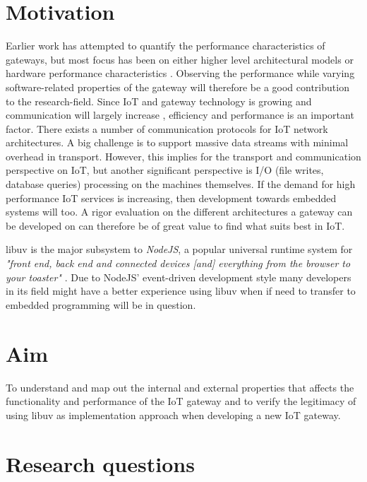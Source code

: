 \section{Motivation}
\label{sec:motivation}

Earlier work has attempted to quantify the performance characteristics of
gateways, but most focus has been on either higher level architectural models
\cite{chen2011brief} \cite{zachariah2015internet} or hardware performance
characteristics \cite{kruger2014benchmarking}. Observing the performance while
varying software-related properties of the gateway will therefore be a good
contribution to the research-field. Since IoT and gateway technology is growing
and communication will largely increase \cite{wu2011m2m}, efficiency and
performance is an important factor. There exists a number of communication
protocols for IoT network architectures. A big challenge is to support massive
data streams with minimal overhead in transport. However, this implies for the
transport and communication perspective on IoT, but another significant
perspective is I/O (file writes, database queries) processing on the machines
themselves. If the demand for high performance IoT services is increasing, then
development towards embedded systems will too. A rigor evaluation on the
different architectures a gateway can be developed on can therefore be of great
value to find what suits best in IoT.

libuv is the major subsystem to \textit{NodeJS}, a popular universal runtime
system for \textit{"front end, back end and connected devices [and] everything
from the browser to your toaster"} \cite{node-js-survey-report-2016}. Due to
NodeJS' event-driven development style many developers in its field might have
a better experience using libuv when if need to transfer to embedded
programming will be in question.

\section{Aim}
\label{sec:aim}

To understand and map out the internal and external properties that affects the
functionality and performance of the IoT gateway and to verify the legitimacy
of using libuv as implementation approach when developing a new IoT gateway.

\section{Research questions}
\label{sec:research-questions}

